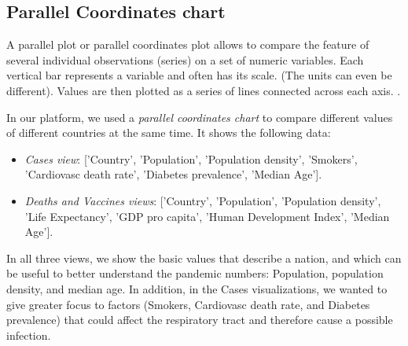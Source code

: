 \documentclass[10pt,conference]{IEEEtran}
\begin{document}
\begin{figure}
\end{figure}

\subsection{Parallel Coordinates chart}
A parallel plot or parallel coordinates plot allows to compare the feature of several individual observations (series) on a set of numeric variables. Each vertical bar represents a variable and often has its scale. (The units can even be different). Values are then plotted as a series of lines connected across each axis. \cite{paral}.

In our platform, we used a {\em parallel coordinates chart} to compare different values of different countries at the same time. 
It shows the following data:
\begin{itemize}
 \item {\em Cases view}: ['Country', 'Population', 'Population density', 'Smokers', 'Cardiovasc death rate', 'Diabetes prevalence', 'Median Age']. 
 \item {\em Deaths and Vaccines views}: ['Country', 'Population', 'Population density', 'Life Expectancy', 'GDP pro capita', 'Human Development Index', 'Median Age']. 
\end{itemize}

In all three views, we show the basic values that describe a nation, and which can be useful to better understand the pandemic numbers: Population, population density, and median age. In addition, in the Cases visualizations, we wanted to give greater focus to factors (Smokers, Cardiovasc death rate, and Diabetes prevalence) that could affect the respiratory tract and therefore cause a possible infection.
\end{document}
